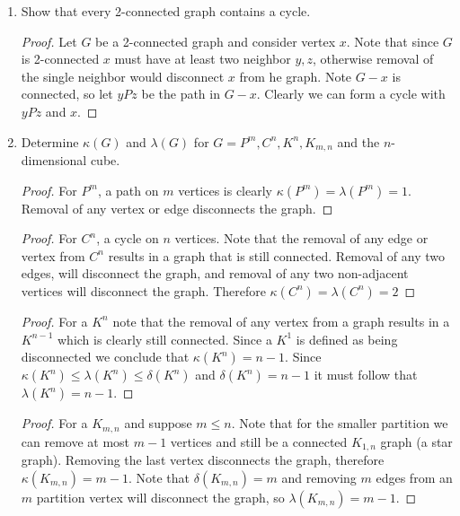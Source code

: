 \documentclass[12pt]{article}
\begin{document}
\begin{enumerate}
	\item Show that every 2-connected graph contains a cycle.\\ 
	\begin{proof} Let $G$ be a 2-connected graph and consider vertex $x$. Note that since $G$ is 2-connected $x$ must have at least two neighbor $y, z$, otherwise removal of the single neighbor would disconnect $x$ from he graph. Note $G - x$ is connected, so let $yPz$ be the path in $G - x$. Clearly we can form a cycle with $yPz$ and $x$. 

	\end{proof}
	\vspace{.5in}




	\item Determine $\kappa(G)$ and $\lambda(G)$ for $G = P^m, C^n, K^n, K_{m, n}$ and the $n$-dimensional cube. \\
	\begin{proof} For $P^m$, a path on $m$ vertices is clearly $\kappa(P^m) = \lambda(P^m) = 1$. Removal of any vertex or edge disconnects the graph. 
	\end{proof}

	\begin{proof} For $C^n$, a cycle on $n$ vertices. Note that the removal of any edge or vertex from $C^n$ results in a graph that is still connected. Removal of any two edges, will disconnect the graph, and removal of any two non-adjacent vertices will disconnect the graph. Therefore $\kappa(C^n) = \lambda(C^n) = 2$
	\end{proof}


	\begin{proof} For a $K^n$ note that the removal of any vertex from a graph results in a $K^{n - 1}$ which is clearly still connected. Since a $K^1$ is defined as being disconnected we conclude that $\kappa(K^n) = n - 1$. Since $\kappa(K^n) \leq \lambda(K^n) \leq \delta(K^n)$ and $\delta(K^n) = n-1$ it must follow that $\lambda(K^n) = n - 1$. 
	\end{proof}

	\begin{proof} For a $K_{m, n}$ and suppose $m \leq n$. Note that for the smaller partition we can remove at most $m - 1$ vertices and still be a connected $K_{1, n}$ graph (a star graph). Removing the last vertex disconnects the graph, therefore $\kappa(K_{m, n}) = m - 1$. Note that $\delta(K_{m, n}) = m$ and removing $m$ edges from an $m$ partition vertex will disconnect the graph, so $\lambda(K_{m, n}) = m - 1$.
	\end{proof}




\end{enumerate}
\end{document}
